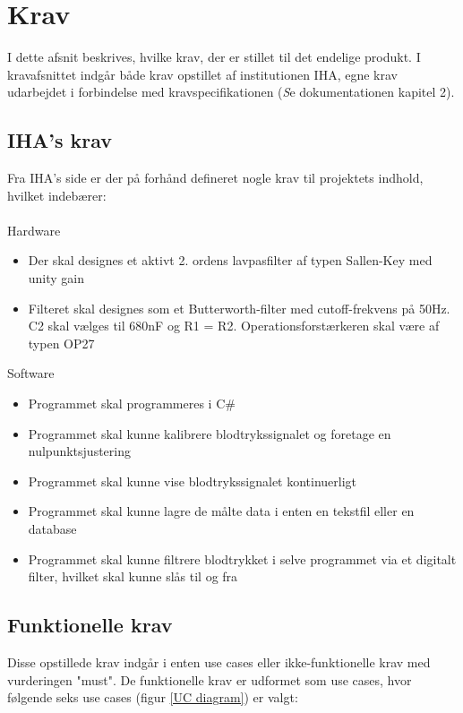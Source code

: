 \chapter{Krav} \label{Krav}
I dette afsnit beskrives, hvilke krav, der er stillet til det endelige produkt. I kravafsnittet indgår både krav opstillet af institutionen IHA, egne krav udarbejdet i forbindelse med kravspecifikationen  (\textit Se dokumentationen kapitel 2).
\section{IHA's krav}
Fra IHA’s side er der på forhånd defineret nogle krav til projektets indhold, hvilket indebærer:\\ \\
Hardware
\begin{itemize}
	\item Der skal designes et aktivt 2. ordens lavpasfilter af typen Sallen-Key med unity gain
	\item Filteret skal designes som et Butterworth-filter med cutoff-frekvens på 50Hz. C2 skal vælges til 680nF og R1 = R2. Operationsforstærkeren skal være af typen OP27
\end{itemize}
Software 
\begin{itemize}
	\item Programmet skal programmeres i C\#
	\item Programmet skal kunne kalibrere blodtrykssignalet og foretage en nulpunktsjustering
	\item Programmet skal kunne vise blodtrykssignalet kontinuerligt
	\item Programmet skal kunne lagre de målte data i enten en tekstfil eller en database
	\item Programmet skal kunne filtrere blodtrykket i selve programmet via et digitalt filter, hvilket skal kunne slås til og fra
\end{itemize}


\section{Funktionelle krav}
Disse opstillede krav indgår i enten use cases eller ikke-funktionelle krav med vurderingen "must". De funktionelle krav er udformet som use cases, hvor følgende seks use cases (figur \ref{UC diagram}) er valgt:

